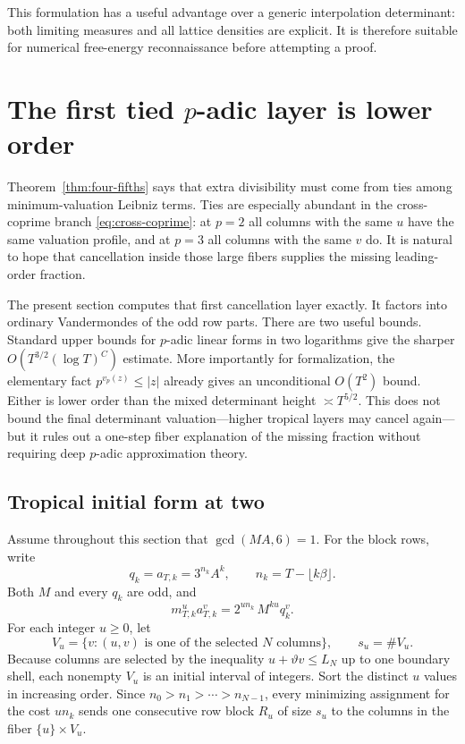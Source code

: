 \documentclass[11pt,oneside]{article}
\theoremstyle{definition}
\theoremstyle{remark}
\begin{document}
This formulation has a useful advantage over a generic interpolation determinant: both
limiting measures and all lattice densities are explicit.  It is therefore suitable for
numerical free-energy reconnaissance before attempting a proof.

\section{The first tied \texorpdfstring{$p$}{p}-adic layer is lower order}
\label{sec:firstlayer}

Theorem~\ref{thm:four-fifths} says that extra divisibility must come from ties among
minimum-valuation Leibniz terms.  Ties are especially abundant in the cross-coprime branch
\eqref{eq:cross-coprime}: at $p=2$ all columns with the same $u$ have the same valuation
profile, and at $p=3$ all columns with the same $v$ do.  It is natural to hope that cancellation
inside those large fibers supplies the missing leading-order fraction.

The present section computes that first cancellation layer exactly.  It factors into ordinary
Vandermondes of the odd row parts.  There are two useful bounds.  Standard upper bounds for
$p$-adic linear forms in two logarithms give the sharper
$O(T^{3/2}(\log T)^C)$ estimate.  More importantly for formalization, the elementary fact
$p^{v_p(z)}\le |z|$ already gives an unconditional $O(T^2)$ bound.  Either is lower order
than the mixed determinant height $\asymp T^{5/2}$.  This does not bound the final determinant
valuation---higher tropical layers may cancel again---but it rules out a one-step fiber
explanation of the missing fraction without requiring deep $p$-adic approximation theory.

\subsection{Tropical initial form at two}

Assume throughout this section that $\gcd(MA,6)=1$.  For the block rows, write
\begin{equation}\label{eq:odd-output}
 q_k=a_{T,k}=3^{n_k}A^k,
 \qquad n_k=T-\lfloor k\beta\rfloor.
\end{equation}
Both $M$ and every $q_k$ are odd, and
\begin{equation}\label{eq:two-entry-factor}
 m_{T,k}^{u}a_{T,k}^{v}
 =2^{u n_k}\,M^{ku}q_k^v.
\end{equation}
For each integer $u\ge0$, let
\[
 V_u=\{v:(u,v)\text{ is one of the selected }N\text{ columns}\},
 \qquad s_u=\#V_u.
\]
Because columns are selected by the inequality $u+\vartheta v\le L_N$ up to one boundary
shell, each nonempty $V_u$ is an initial interval of integers.  Sort the distinct $u$ values
in increasing order.  Since $n_0>n_1>\cdots>n_{N-1}$, every minimizing assignment for the
cost $un_k$ sends one consecutive row block $R_u$ of size $s_u$ to the columns in the fiber
$\{u\}\times V_u$.
\end{document}
